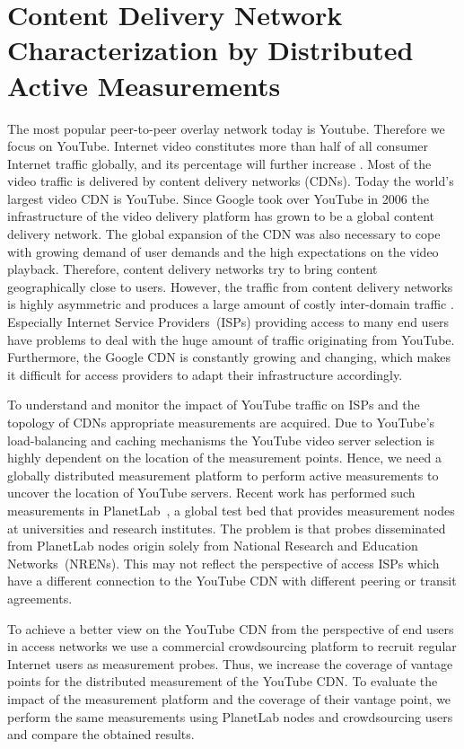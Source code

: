 \section{Content Delivery Network Characterization by Distributed Active Measurements}\label{sec:aslevel:crowd}

The most popular peer-to-peer overlay network today is Youtube.
Therefore we focus on YouTube.
Internet video constitutes more than half of all consumer Internet traffic globally, and its percentage will further increase \cite{ciscovni2013}. Most of the video traffic is delivered by content delivery networks (CDNs). Today the world's largest video CDN is YouTube. Since Google took over YouTube in 2006 the infrastructure of the video delivery platform has grown to be a global content delivery network.
The global expansion of the CDN was also necessary to cope with growing demand of user demands and the high expectations on the video playback. Therefore, content delivery networks try to bring content geographically close to users.
However, the traffic from content delivery networks is highly asymmetric and produces a large amount of costly inter-domain traffic \cite{labovitz2010internet}. Especially Internet Service Providers~(ISPs) providing access to many end users have problems to deal with the huge amount of traffic originating from YouTube. Furthermore, the Google CDN is constantly growing and changing, which makes it difficult for access providers to adapt their infrastructure accordingly.

To understand and monitor the impact of YouTube traffic on ISPs and the topology of CDNs appropriate measurements are acquired. Due to YouTube's load-balancing and caching mechanisms the YouTube video server selection is highly dependent on the location of the measurement points. Hence, we need a globally distributed measurement platform to perform active measurements to uncover the location of YouTube servers. Recent work \cite{adhikari2012vivisecting,adhikari2011you} has performed such measurements in PlanetLab~\cite{planetlab}, a global test bed that provides measurement nodes at universities and research institutes.
The problem is that probes disseminated from PlanetLab nodes origin solely from National Research and Education Networks~(NRENs). This may not reflect the perspective of access ISPs which have a different connection to the YouTube CDN with different peering or transit agreements.

To achieve a better view on the YouTube CDN from the perspective of end users in access networks we use a commercial crowdsourcing platform to recruit regular Internet users as measurement probes.
Thus, we increase the coverage of vantage points for the distributed measurement of the YouTube CDN.
To evaluate the impact of the measurement platform and the coverage of their vantage point,  we perform the same measurements using PlanetLab nodes and crowdsourcing users and compare the obtained results.

